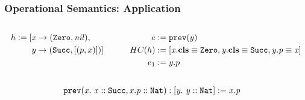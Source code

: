 \begin{frame}[t,fragile]
\frametitle{Operational Semantics: Application}
\begin{columns}
\begin{column}{0.4\textwidth}
\begin{align*}
  h := [ &x \rightarrow (\texttt{Zero}, \mathit{nil}), \\
         &y \rightarrow (\texttt{Succ}, [(p, x)])]
\end{align*}
\end{column}
\begin{column}{0.6\textwidth}
\begin{align*}
  e &:= \texttt{prev}(y)\\
  HC(h) & := [\mathit{x}.\textbf{cls} \equiv \mathit{\texttt{Zero}}, \mathit{y}.\textbf{cls} \equiv \mathit{\texttt{Succ}}, \mathit{y.p} \equiv \mathit{x}]\\
  e_1 &:= y.p
\end{align*}
\end{column}
\end{columns}
\begin{align*}
&\mathit{\texttt{prev}}(\mathit{x}.\ \mathit{\mathit{x} :: \mathit{\texttt{Succ}}, \mathit{x.p} :: \mathit{\texttt{Nat}}}): \mathit{[y.\ \mathit{\mathit{y} :: \mathit{\texttt{Nat}}}]} := \mathit{x.p}
\end{align*}
\end{frame}
